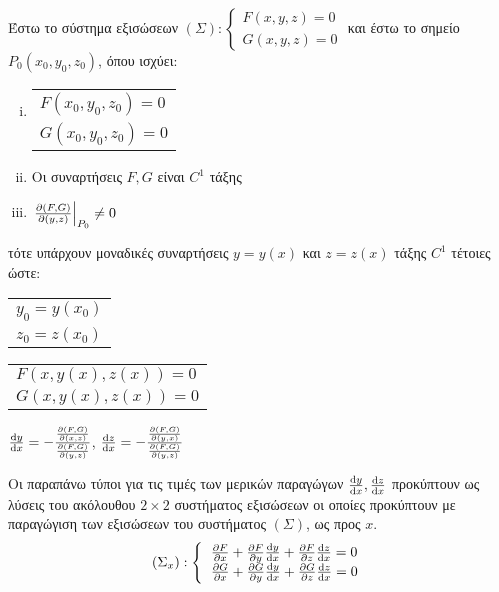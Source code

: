 Έστω το σύστημα εξισώσεων $(\Sigma):
\begin{cases}
    F(x,y,z) = 0  \\
    G(x,y,z) = 0
\end{cases}$
και έστω το σημείο $ P_0(x_0,y_0,z_0) $, όπου ισχύει:
\begin{enumerate}[(i)]
    \item  \begin{tabular}{l}
            $F(x_0,y_0,z_0) = 0$ \\
            $G(x_0,y_0,z_0) = 0$
        \end{tabular}
    \item Οι συναρτήσεις $ F, G $ είναι $ C^{1} $ τάξης 
    \item $ \left.\pdv{(F,G)}{(y,z)}\right|_{P_0} \neq 0 $ 
\end{enumerate}
τότε υπάρχουν μοναδικές συναρτήσεις $ y = y(x) $ και $ z = z(x) $ τάξης $ C^{1} $ 
τέτοιες ώστε:
\begin{myitemize}
    \item \begin{tabular}{l}
            $ y_0 = y(x_0) $ \\
            $ z_0 = z(x_0) $
        \end{tabular}
    \item \begin{tabular}{l}
            $ F(x,y(x),z(x)) = 0 $ \\
            $ G(x,y(x),z(x)) = 0 $
        \end{tabular}
    \item $ \dv{y}{x} = - \frac{\pdv{(F,G)}{(x,z)}}{\pdv{(F,G)}{(y,z)}} $, 
        $ \dv{z}{x} = - \frac{\pdv{(F,G)}{(y,x)}}{\pdv{(F,G)}{(y,z)}} $
\end{myitemize}

\begin{rem}
    Οι παραπάνω τύποι για τις τιμές των μερικών παραγώγων $ \dv{y}{x}, \dv{z}{x}$ 
    προκύπτουν ως λύσεις του ακόλουθου $ 2 \times 2 $ συστήματος εξισώσεων οι οποίες 
    προκύπτουν με παραγώγιση των εξισώσεων του συστήματος $ (\Sigma) $, ως προς $x$.
    \renewcommand{\arraystretch}{2}
    \[
        \begin{aligned}
            (\Sigma_x): \left\{\begin{tabular}{l}
                    $\pdv{F}{x} + \pdv{F}{y}\dv{y}{x} + \pdv{F}{z}\dv{z}{x} = 0$ \\
                    $\pdv{G}{x} + \pdv{G}{y}\dv{y}{x} + \pdv{G}{z}\dv{z}{x} = 0$
                \end{tabular}
            \right.
        \end{aligned}
    \]
\end{rem}

